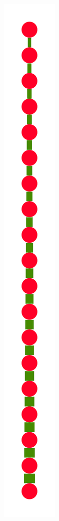 \documentclass[a4paper,10pt]{article}
\begin{document}
\begin{figure}
{    \includegraphics[scale=.14]{./figures/6-3-recursion-data-2.pdf}
}
\end{figure}
\end{document}
